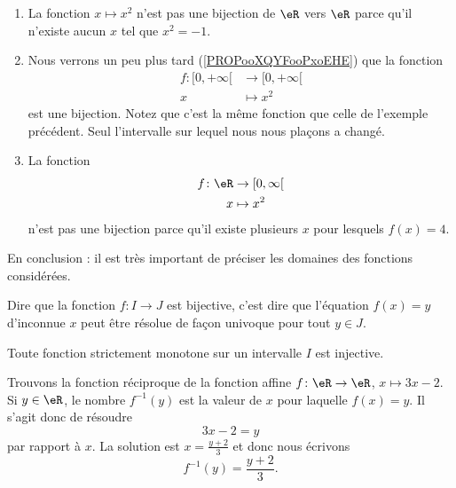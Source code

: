 \begin{example}     \label{EXooCWYHooLEciVj}
	\begin{enumerate}
		\item
		      La fonction \( x\mapsto x^2\) n'est pas une bijection de \( \eR\) vers \( \eR\) parce qu'il n'existe aucun \( x\) tel que \( x^2=-1\).
		\item
		      Nous verrons un peu plus tard (\ref{PROPooXQYFooPxoEHE}) que la fonction
		      \begin{equation}
			      \begin{aligned}
				      f\colon \mathopen[ 0 , +\infty [ & \to \mathopen[ 0 , +\infty [ \\
				      x                                & \mapsto x^2
			      \end{aligned}
		      \end{equation}
		      est une bijection. Notez que c'est la même fonction que celle de l'exemple précédent. Seul l'intervalle sur lequel nous nous plaçons a changé.
		\item
		      La fonction
		      \begin{equation}
			      \begin{aligned}
				      f\colon \eR & \to \mathopen[ 0 , \infty \mathclose[ \\
				      x           & \mapsto x^2
			      \end{aligned}
		      \end{equation}
		      n'est pas une bijection parce qu'il existe plusieurs \( x\) pour lesquels \( f(x)=4\).
	\end{enumerate}
	En conclusion : il est très important de préciser les domaines des fonctions considérées.
\end{example}

\begin{remark}
	Dire que la fonction \( f\colon I\to J\) est bijective, c'est dire que l'équation \( f(x)=y\) d'inconnue \( x\) peut être résolue de façon univoque pour tout \( y\in J\).
\end{remark}

\begin{lemma}       \label{LEMooSDMMooYYDDLs}
	Toute fonction strictement monotone sur un intervalle \( I\) est injective.
\end{lemma}

\begin{example}
	Trouvons la fonction réciproque de la fonction affine \( f\colon \eR\to \eR\), \( x\mapsto 3x-2\). Si \( y\in \eR\), le nombre \( f^{-1}(y)\) est la valeur de \( x\) pour laquelle \( f(x)=y\). Il s'agit donc de résoudre
	\begin{equation}
		3x-2=y
	\end{equation}
	par rapport à \( x\). La solution est \( x=\frac{ y+2 }{ 3 }\) et donc nous écrivons
	\begin{equation}
		f^{-1}(y)=\frac{ y+2 }{ 3 }.
	\end{equation}
\end{example}

